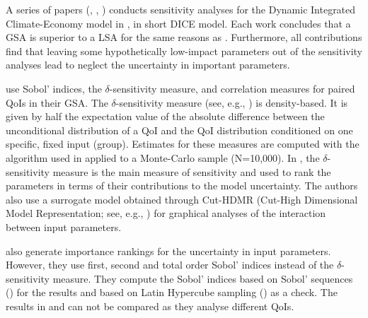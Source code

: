 \newline
A series of papers (\cite{Anderson.2014}, \cite{Butler.2014}, \cite{Miftakhova.2018}) conducts sensitivity analyses for the Dynamic Integrated Climate-Economy model in \cite{Nordhaus.2008}, in short DICE model.  Each work concludes that a GSA is superior to a LSA for the same reasons as \cite{Harenberg.2019}. Furthermore, all contributions find that leaving some hypothetically low-impact parameters out of the sensitivity analyses lead \citeauthor{Nordhaus.2008} to neglect the uncertainty in important parameters.

\cite{Anderson.2014} use Sobol' indices, the $\delta$-sensitivity measure, and correlation measures for paired QoIs in their GSA. The $\delta$-sensitivity measure (see, e.g., \cite{Borgonovo.2006}) is density-based. It is given by half the expectation value of the absolute difference between the unconditional distribution of a QoI and the QoI distribution conditioned on one specific, fixed input (group). Estimates for these measures are computed with the algorithm used in \cite{Plischke.2013} applied to a Monte-Carlo sample (N=10,000). In \cite{Anderson.2014}, the $\delta$-sensitivity measure is the main measure of sensitivity and used to rank the parameters in terms of their contributions to the model uncertainty. The authors also use a surrogate model obtained through Cut-HDMR (Cut-High Dimensional Model Representation; see, e.g., \cite{Ziehn.2009}) for graphical analyses of the interaction between input parameters.

\cite{Butler.2014} also generate importance rankings for the uncertainty in input parameters. However, they use first, second and total order Sobol' indices instead of the $\delta$-sensitivity measure. They compute the Sobol' indices based on Sobol' sequences (\cite{Sobol.1967}) for the results and based on Latin Hypercube sampling (\cite{McKay.1979}) as a check. The results in \cite{Butler.2014} and \cite{Anderson.2014} can not be compared as they analyse different QoIs.

